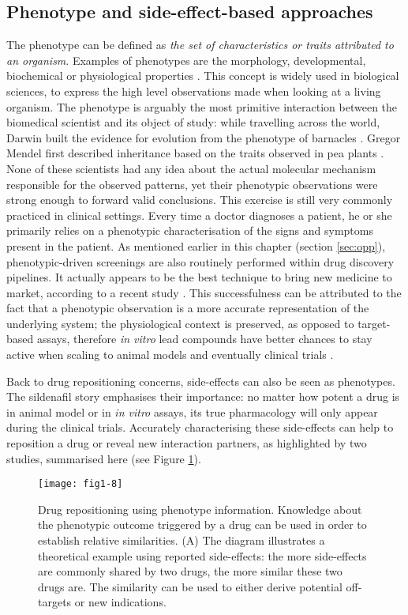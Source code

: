\subsection{Phenotype and side-effect-based approaches}
The phenotype can be defined as \emph{the set of characteristics or traits attributed to an organism}. Examples of phenotypes are the morphology, developmental, biochemical or physiological properties \citep{phenotypewiki}. This concept is widely used in biological sciences, to express the high level observations made when looking at a living organism. The phenotype is arguably the most primitive interaction between the biomedical scientist and its object of study: while travelling across the world, Darwin built the evidence for evolution from the phenotype of barnacles \citep{darwin2009origin}. Gregor Mendel first described inheritance based on the traits observed in pea plants \citep{mendel1866versuche}. None of these scientists had any idea about the actual molecular mechanism responsible for the observed patterns, yet their phenotypic observations were strong enough to forward valid conclusions. This exercise is still very commonly practiced in clinical settings. Every time a doctor diagnoses a patient, he or she primarily relies on a phenotypic characterisation of the signs and symptoms present in the patient. As mentioned earlier in this chapter (section \ref{sec:opp}), phenotypic-driven screenings are also routinely performed within drug discovery pipelines. It actually appears to be the best technique to bring new medicine to market, according to a recent study \citep{swinney2011were}. This successfulness can be attributed to the fact that a phenotypic observation is a more accurate representation of the underlying system; the physiological context is preserved, as opposed to target-based assays, therefore \emph{in vitro} lead compounds have better chances to stay active when scaling to animal models and eventually clinical trials \citep{duran2012recycling}.

Back to drug repositioning concerns, side-effects can also be seen as phenotypes. The sildenafil story emphasises their importance: no matter how potent a drug is in animal model or in \emph{in vitro} assays, its true pharmacology will only appear during the clinical trials. Accurately characterising these side-effects can help to reposition a drug or reveal new interaction partners, as highlighted by two studies, summarised here (see Figure \ref{fig1-8}).

\begin{figure}[ht]
    \centering
    \texttt{[image: fig1-8]}
    \caption{Drug repositioning using phenotype information. Knowledge about the phenotypic outcome triggered by a drug can be used in order to establish relative similarities. (A) The diagram illustrates a theoretical example using reported side-effects: the more side-effects are commonly shared by two drugs, the more similar these two drugs are. The similarity can be used to either derive potential off-targets or new indications.}
    \label{fig1-8}
\end{figure}

